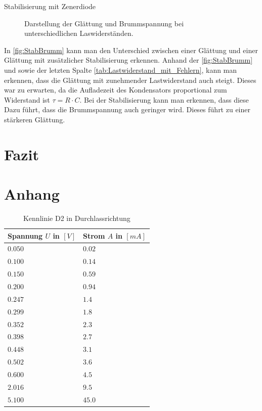 \documentclass{article}
\theoremstyle{definition}
\begin{document}
\begin{aufgabe}{Stabilisierung mit Zenerdiode}
\begin{figure}[h!]
    \caption{Darstellung der Glättung und Brummspannung bei unterschiedlichen Laswiderständen.}
    \label{fig:StabBrumm}
\end{figure}

In \autoref{fig:StabBrumm} kann man den Unterschied zwischen einer Glättung und einer Glättung mit zusätzlicher Stabilisierung erkennen. Anhand der \autoref{fig:StabBrumm} und sowie der letzten Spalte \autoref{tab:Lastwiderstand_mit_Fehlern}, kann man erkennen, dass die Glättung mit zunehmender Lastwiderstand auch steigt. Dieses war zu erwarten, da die Aufladezeit des Kondensators proportional zum Widerstand ist $\tau = R \cdot C$. Bei der Stabilisierung kann man erkennen, dass diese Dazu führt, dass die Brummspannung auch geringer wird. Dieses führt zu einer stärkeren Glättung.

\end{aufgabe}




\section{Fazit}




\section{Anhang}

    
\begin{table}[h!]
    \centering
    \begin{tabular}{|l|l|}
    \hline
    \textbf{Spannung $U$ in $[V]$} & \textbf{Strom $A$ in $[mA]$} \\
    \hline
    $0.050$ & $0.02$ \\
    $0.100$ & $0.14$ \\
    $0.150$ & $0.59$ \\
    $0.200$ & $0.94$\\
    $0.247$ & $1.4$ \\
    $0.299$ & $1.8$ \\
    $0.352$ & $2.3$ \\
    $0.398$ & $2.7$\\
    $0.448$ & $3.1$ \\
    $0.502$ & $3.6$ \\
    $0.600$ & $4.5$ \\
    $2.016$ & $9.5$ \\
    $5.100$ & $45.0$ \\
    \hline
    \end{tabular}
    \caption{Kennlinie D2 in Durchlassrichtung}
    \label{tab:D2duchlass}
    \end{table}
    
\end{document}
